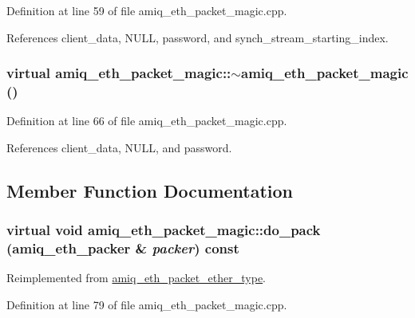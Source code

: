 Definition at line 59 of file amiq\_\-eth\_\-packet\_\-magic.cpp.

References client\_\-data, NULL, password, and synch\_\-stream\_\-starting\_\-index.\hypertarget{classamiq__eth__packet__magic_a56f19042d3acfd4cd22d05b25962936f}{
\subsubsection[{$\sim$amiq\_\-eth\_\-packet\_\-magic}]{\setlength{\rightskip}{0pt plus 5cm}virtual amiq\_\-eth\_\-packet\_\-magic::$\sim$amiq\_\-eth\_\-packet\_\-magic ()}}
\label{classamiq__eth__packet__magic_a56f19042d3acfd4cd22d05b25962936f}


Definition at line 66 of file amiq\_\-eth\_\-packet\_\-magic.cpp.

References client\_\-data, NULL, and password.

\subsection{Member Function Documentation}
\hypertarget{classamiq__eth__packet__magic_ad026a187c1d882aa1698a3b0d4209472}{
\subsubsection[{do\_\-pack}]{\setlength{\rightskip}{0pt plus 5cm}virtual void amiq\_\-eth\_\-packet\_\-magic::do\_\-pack ({\bf amiq\_\-eth\_\-packer} \& {\em packer}) const}}
\label{classamiq__eth__packet__magic_ad026a187c1d882aa1698a3b0d4209472}


Reimplemented from \hyperlink{classamiq__eth__packet__ether__type_a62fe5f26a466f0bd0045599b89aa6926}{amiq\_\-eth\_\-packet\_\-ether\_\-type}.

Definition at line 79 of file amiq\_\-eth\_\-packet\_\-magic.cpp.

